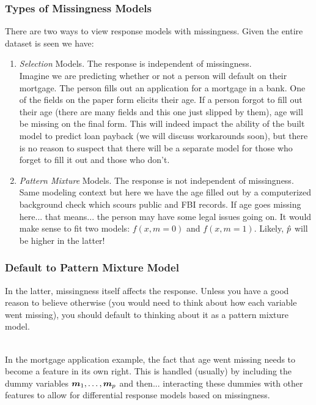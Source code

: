 \documentclass[handout]{beamer}
\begin{document}
\begin{frame}\frametitle{Types of Missingness Models}

There are two ways to view response models with missingness. Given the entire dataset is seen we have:
\begin{enumerate}
\item \emph{Selection} Models. The response is independent of missingness.\\ \pause 
\footnotesize
Imagine we are predicting whether or not a person will default on their mortgage. The person fills out an application for a mortgage in a bank. One of the fields on the paper form elicits their age. If a person forgot to fill out their age (there are many fields and this one just slipped by them), age will be missing on the final form. This will indeed impact the ability of the built model to predict loan payback (we will discuss workarounds soon), but there is no reason to suspect that there will be a separate model for those who forget to fill it out and those who don't. \pause

\item \emph{Pattern Mixture} Models. The response is not independent of missingness.\\ \pause
\footnotesize
Same modeling context but here we have the age filled out by a computerized background check which scours public and FBI records. If age goes missing here... that means... \pause the person may have some legal issues going on. It would make sense to fit two models: $f(x, m = 0)$ and $f(x, m = 1)$. Likely, $\hat{p}$ will be higher in the latter!

%
\end{enumerate}


\end{frame}


\begin{frame}\frametitle{Default to Pattern Mixture Model}

In the latter, missingness itself affects the response. Unless you have a good reason to believe otherwise (you would need to think about how each variable went missing), you should default to thinking about it as a pattern mixture model.\\~\\  \pause

In the mortgage application example, the fact that age went missing needs to become a feature in its own right. \pause This is handled (usually) by including the dummy variables $\boldsymbol{m}_1, \ldots, \boldsymbol{m}_p$ and then... \pause interacting these dummies with other features to allow for differential response models based on missingness.
	
\end{frame}
\end{document}
